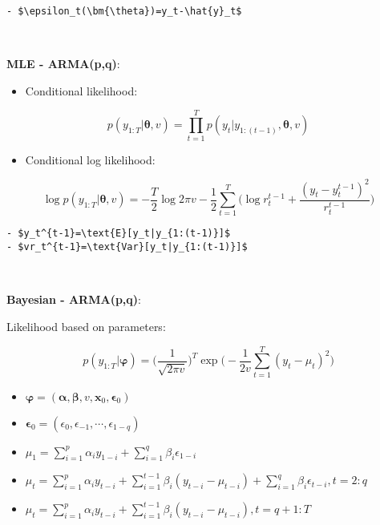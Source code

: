 \documentclass[
]{book}
\providecommand{\tightlist}{%
  \setlength{\itemsep}{0pt}\setlength{\parskip}{0pt}}
\begin{document}
\begin{verbatim}
- $\epsilon_t(\bm{\theta})=y_t-\hat{y}_t$
\end{verbatim}

~

\textbf{MLE - ARMA(p,q)}:

\begin{itemize}
\tightlist
\item
  Conditional likelihood:
\end{itemize}

\[\begin{equation*}
        p(y_{1:T}|\bm{\theta},v)=\prod_{t=1}^T{p(y_t|y_{1:(t-1)},\bm{\theta},v)}
    \end{equation*}\]

\begin{itemize}
\tightlist
\item
  Conditional log likelihood:
\end{itemize}

\[\begin{equation*}
        \log{p(y_{1:T}|\bm{\theta},v)}=-\frac{T}{2}\log{2\pi v}-\frac{1}{2}\sum_{t=1}^T{\Big(\log{r_t^{t-1}}+\frac{(y_t-y_t^{t-1})^2}{r_t^{t-1}}\Big)}
    \end{equation*}\]

\begin{verbatim}
- $y_t^{t-1}=\text{E}[y_t|y_{1:(t-1)}]$
- $vr_t^{t-1}=\text{Var}[y_t|y_{1:(t-1)}]$
\end{verbatim}

~

\textbf{Bayesian - ARMA(p,q)}:

Likelihood based on parameters:

\[\begin{equation*}
        p(y_{1:T}|\bm{\varphi})=\big(\frac{1}{\sqrt{2\pi v}}\big)^T\exp{\bigg(-\frac{1}{2v}\sum_{t=1}^T{(y_t-\mu_t)^2}\bigg)}
    \end{equation*}\]

\begin{itemize}
\tightlist
\item
  \(\bm{\varphi}=(\bm{\alpha},\bm{\beta},v,\bm{x}_0,\bm{\epsilon}_0)\)
\item
  \(\bm{\epsilon}_0=(\epsilon_0,\epsilon_{-1},\cdots,\epsilon_{1-q})\)
\item
  \(\mu_1=\sum_{i=1}^p{\alpha_iy_{1-i}}+\sum_{i=1}^q{\beta_i\epsilon_{1-i}}\)
\item
  \(\mu_t=\sum_{i=1}^p{\alpha_iy_{t-i}}+\sum_{i=1}^{t-1}{\beta_i(y_{t-i}-\mu_{t-i})}+\sum_{i=1}^q{\beta_i\epsilon_{t-i}},t=2:q\)
\item
  \(\mu_t=\sum_{i=1}^p{\alpha_iy_{t-i}}+\sum_{i=1}^{t-1}{\beta_i(y_{t-i}-\mu_{t-i})},t=q+1:T\)
\end{itemize}
\end{document}
